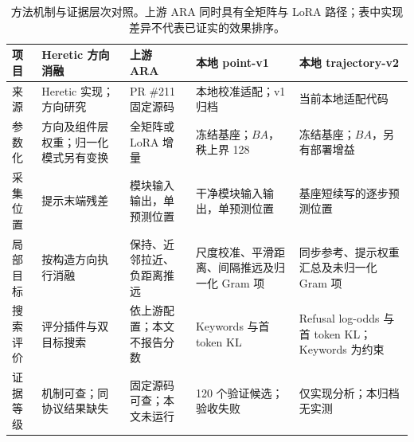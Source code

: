 \begin{table}[tbp]
 \centering
 \caption{方法机制与证据层次对照。上游 ARA 同时具有全矩阵与 LoRA 路径；表中实现差异不代表已证实的效果排序。}
 \label{tab:methods}
 \small
 \setlength{\tabcolsep}{4pt}
 \renewcommand{\arraystretch}{1.15}
 \begin{tabularx}{\linewidth}{@{}p{14mm}YYYY@{}}
  \toprule
  项目 & Heretic 方向消融 & 上游 ARA & 本地 point-v1 & 本地 trajectory-v2 \\
  \midrule
  来源 & Heretic 实现；方向研究\cite{arditi2024,heretic} & PR \#211 固定源码\cite{upstreamara} & 本地校准适配；v1 归档\cite{araarchive} & 当前本地适配代码 \\
  参数化 & 方向及组件层权重；归一化模式另有变换 & 全矩阵或 LoRA 增量 & 冻结基座；$BA$，秩上界 128 & 冻结基座；$BA$，另有部署增益 \\
  采集位置 & 提示末端残差 & 模块输入输出，单预测位置 & 干净模块输入输出，单预测位置 & 基座短续写的逐步预测位置 \\
  局部目标 & 按构造方向执行消融 & 保持、近邻拉近、负距离推远 & 尺度校准、平滑距离、间隔推远及归一化 Gram 项 & 同步参考、提示权重汇总及未归一化 Gram 项 \\
  搜索评价 & 评分插件与双目标搜索 & 依上游配置；本文不报告分数 & Keywords 与首 token KL & Refusal log-odds 与首 token KL；Keywords 为约束 \\
  证据等级 & 机制可查；同协议结果缺失 & 固定源码可查；本文未运行 & 120 个验证候选；验收失败 & 仅实现分析；本归档无实测 \\
  \bottomrule
 \end{tabularx}
\end{table}
